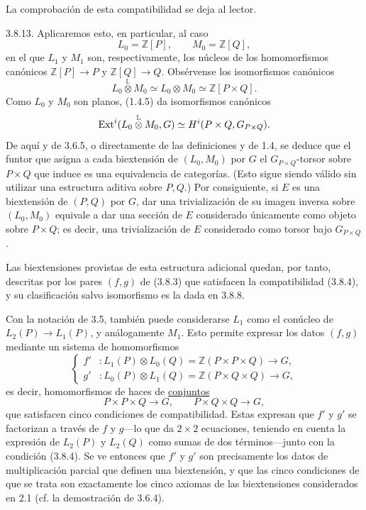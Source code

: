 La comprobación de esta compatibilidad se deja al lector.

3.8.13. Aplicaremos esto, en particular, al caso
\[
 L_0=\mathbb Z[P],\qquad M_0=\mathbb Z[Q],
\]
en el que $L_1$ y $M_1$ son, respectivamente, los núcleos de los
homomorfismos canónicos $\mathbb Z[P]\longrightarrow P$ y
$\mathbb Z[Q]\longrightarrow Q$. Obsérvense los isomorfismos
canónicos
\[
 L_0\mathbin{\overset{\mathbb L}{\otimes}}M_0
 \simeq L_0\otimes M_0
 \simeq\mathbb Z[P\times Q].
\]
Como $L_0$ y $M_0$ son planos, (1.4.5) da isomorfismos canónicos
\[
 \operatorname{Ext}^i(L_0\mathbin{\overset{\mathbb L}{\otimes}}M_0,G)
 \simeq H^i(P\times Q,G_{P\times Q}).
\]
De aquí y de 3.6.5, o directamente de las definiciones y de 1.4, se
deduce que el funtor que asigna a cada biextensión de $(L_0,M_0)$ por
$G$ el $G_{P\times Q}$-torsor sobre $P\times Q$ que induce es una
equivalencia de categorías. (Esto sigue siendo válido sin utilizar
una estructura aditiva sobre $P,Q$.) Por consiguiente, si $E$ es una
biextensión de $(P,Q)$ por $G$, dar una trivialización de su imagen
inversa sobre $(L_0,M_0)$ equivale a dar una sección de $E$
considerado únicamente como objeto sobre $P\times Q$; es decir, una
trivialización de $E$ considerado como torsor bajo $G_{P\times Q}$.

Las biextensiones provistas de esta estructura adicional quedan, por
tanto, descritas por los pares $(f,g)$ de (3.8.3) que satisfacen la
compatibilidad (3.8.4), y su clasificación salvo isomorfismo es la
dada en 3.8.8.

Con la notación de 3.5, también puede considerarse $L_1$ como el
conúcleo de $L_2(P)\longrightarrow L_1(P)$, y análogamente $M_1$.
Esto permite expresar los datos $(f,g)$ mediante un sistema de
homomorfismos
\[
\left\{
\begin{aligned}
 f'&:L_1(P)\otimes L_0(Q)
     =\mathbb Z(P\times P\times Q)\longrightarrow G,\\
 g'&:L_0(P)\otimes L_1(Q)
     =\mathbb Z(P\times Q\times Q)\longrightarrow G,
\end{aligned}
\right.
\]
es decir, homomorfismos de haces de \underline{conjuntos}
\[
 P\times P\times Q\longrightarrow G,\qquad
 P\times Q\times Q\longrightarrow G,
\]
que satisfacen cinco condiciones de compatibilidad. Estas expresan
que $f'$ y $g'$ se factorizan a través de $f$ y $g$---lo que da
$2\times2$ ecuaciones, teniendo en cuenta la expresión de $L_2(P)$ y
$L_2(Q)$ como sumas de dos términos---junto con la condición (3.8.4).
Se ve entonces que $f'$ y $g'$ son precisamente los datos de
multiplicación parcial que definen una biextensión, y que las cinco
condiciones de que se trata son exactamente los cinco axiomas de las
biextensiones considerados en 2.1 (cf. la demostración de 3.6.4).


